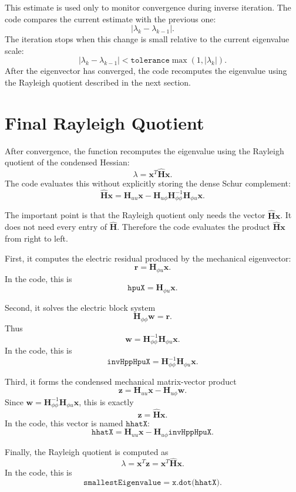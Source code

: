 \documentclass[11pt]{article}
\begin{document}
This estimate is used only to monitor convergence during inverse
iteration. The code compares the current estimate with the previous one:
\[
    |\lambda_k-\lambda_{k-1}|.
\]
The iteration stops when this change is small relative to the current
eigenvalue scale:
\[
    |\lambda_k-\lambda_{k-1}|
    <
    \texttt{tolerance}
    \max(1,|\lambda_k|).
\]
After the eigenvector has converged, the code recomputes the eigenvalue
using the Rayleigh quotient described in the next section.

\section{Final Rayleigh Quotient}

After convergence, the function recomputes the eigenvalue using the
Rayleigh quotient of the condensed Hessian:
\[
    \lambda
    =
    \bm x^T \widehat{\bm H}\bm x.
\]
The code evaluates this without explicitly storing the dense Schur
complement:
\[
    \widehat{\bm H}\bm x
    =
    \bm H_{uu}\bm x
    -
    \bm H_{u\phi}
    \bm H_{\phi\phi}^{-1}
    \bm H_{\phi u}\bm x.
\]

The important point is that the Rayleigh quotient only needs the vector
\(\widehat{\bm H}\bm x\). It does not need every entry of
\(\widehat{\bm H}\). Therefore the code evaluates the product
\(\widehat{\bm H}\bm x\) from right to left.

First, it computes the electric residual produced by the mechanical
eigenvector:
\[
    \bm r = \bm H_{\phi u}\bm x.
\]
In the code, this is
\[
    \texttt{hpuX} = \bm H_{\phi u}\bm x.
\]

Second, it solves the electric block system
\[
    \bm H_{\phi\phi}\bm w = \bm r.
\]
Thus
\[
    \bm w
    =
    \bm H_{\phi\phi}^{-1}\bm H_{\phi u}\bm x.
\]
In the code, this is
\[
    \texttt{invHppHpuX}
    =
    \bm H_{\phi\phi}^{-1}\bm H_{\phi u}\bm x.
\]

Third, it forms the condensed mechanical matrix-vector product
\[
    \bm z
    =
    \bm H_{uu}\bm x
    -
    \bm H_{u\phi}\bm w.
\]
Since \(\bm w=\bm H_{\phi\phi}^{-1}\bm H_{\phi u}\bm x\), this is exactly
\[
    \bm z
    =
    \widehat{\bm H}\bm x.
\]
In the code, this vector is named \(\texttt{hhatX}\):
\[
    \texttt{hhatX}
    =
    \bm H_{uu}\bm x
    -
    \bm H_{u\phi}\texttt{invHppHpuX}.
\]

Finally, the Rayleigh quotient is computed as
\[
    \lambda
    =
    \bm x^T\bm z
    =
    \bm x^T\widehat{\bm H}\bm x.
\]
In the code, this is
\[
    \texttt{smallestEigenvalue}
    =
    \texttt{x.dot(hhatX)}.
\]
\end{document}
